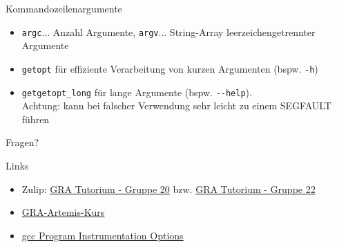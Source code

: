 \documentclass[
  german,            %
  aspectratio=169,    %
]{tumbeamer}
\begin{document}
\begin{frame}[c, fragile]{Kommandozeilenargumente}{}
  \begin{itemize}
    \item \verb|argc|... Anzahl Argumente, \verb|argv|... String-Array leerzeichengetrennter Argumente
    \item \verb|getopt| für effiziente Verarbeitung von kurzen Argumenten (bspw. \verb|-h|)
    \item \verb|getgetopt_long| für lange Argumente (bspw. \verb|--help|).\\Achtung: kann bei falscher 
    Verwendung sehr leicht zu einem SEGFAULT führen
  \end{itemize}
\end{frame}

\begin{frame}[c]{}{}
  \begin{center}
    \LARGE Fragen?
  \end{center}
\end{frame}

\begin{frame}[fragile, c]{Links}{}
  \begin{itemize}
    \item Zulip: \href{https://zulip.in.tum.de/#narrow/stream/2267-GRA-Tutorium---Gruppe-20}{\glqq GRA Tutorium - Gruppe 20\grqq}
          bzw. \href{https://zulip.in.tum.de/#narrow/stream/2269-GRA-Tutorium---Gruppe-22}{\glqq GRA Tutorium - Gruppe 22\grqq}
    \item \href{https://artemis.in.tum.de/courses/329}{GRA-Artemis-Kurs}
    \item \href{https://gcc.gnu.org/onlinedocs/gcc/Instrumentation-Options.html}{gcc Program Instrumentation Options}
  \end{itemize}
\end{frame}

\maketitle
\end{document}
